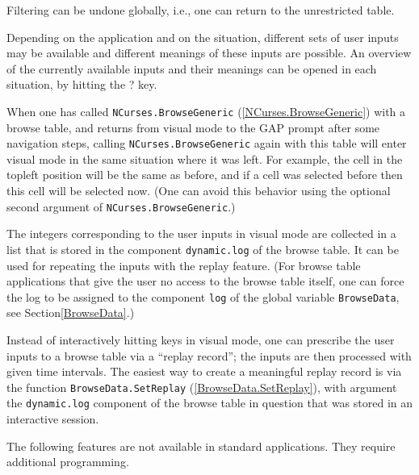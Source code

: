 \documentclass[a4paper,11pt]{report}
\begin{document}
{{\begin{description}
 Filtering can be undone globally, i.{\nobreakspace}e., one can return to the
unrestricted table. 
\item[{Help:\index{help window for a browse table}}]  Depending on the application and on the situation, different sets of user
inputs may be available and different meanings of these inputs are possible.
An overview of the currently available inputs and their meanings can be opened
in each situation, by hitting the \textsc{?} key. 
\item[{Re\texttt{\symbol{45}}entering:}]  When one has called \texttt{NCurses.BrowseGeneric} (\ref{NCurses.BrowseGeneric}) with a browse table, and returns from visual mode to the \textsf{GAP} prompt after some navigation steps, calling \texttt{NCurses.BrowseGeneric} again with this table will enter visual mode in the same situation where it
was left. For example, the cell in the top\texttt{}left position
will be the same as before, and if a cell was selected before then this cell
will be selected now. (One can avoid this behavior using the optional second
argument of \texttt{NCurses.BrowseGeneric}.) 
\item[{Logging:\index{log of a browse table session}}]  The integers corresponding to the user inputs in visual mode are collected in
a list that is stored in the component \texttt{dynamic.log} of the browse table. It can be used for repeating the inputs with the replay
feature. (For browse table applications that give the user no access to the
browse table itself, one can force the log to be assigned to the component \texttt{log} of the global variable \texttt{BrowseData},  see Section{\nobreakspace}\ref{BrowseData}.) 
\item[{Replay:\index{replay of a browse table session}}]  Instead of interactively hitting keys in visual mode, one can prescribe the
user inputs to a browse table via a ``replay record''; the inputs are then processed with given time intervals. The easiest way to
create a meaningful replay record is via the function \texttt{BrowseData.SetReplay} (\ref{BrowseData.SetReplay}), with argument the \texttt{dynamic.log} component of the browse table in question that was stored in an interactive
session. 
\end{description}
 

 The following features are not available in standard applications. They
require additional programming. 

}}
\end{document}
